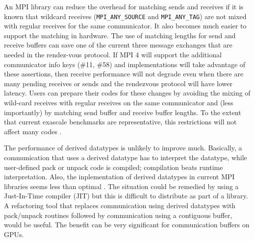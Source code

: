 An MPI library can reduce the overhead for matching sends and receives if it is 
known  that wildcard receives (\texttt{MPI\_ANY\_SOURCE} and 
\texttt{MPI\_ANY\_TAG}) are not mixed with regular receives for the same 
communicator. It also becomes much easier to support 
the matching in hardware. The use of matching lengths for send and receive 
buffers can save one of the current three message exchanges that are needed in 
the rendez-vous protocol. If MPI 4 will support the additional communicator 
info keys (\#11, \#58) and implementations will take advantage of these 
assertions, 
then receive performance will not degrade even when there are many pending 
receives or sends and the rendezvous protocol will have lower latency. Users 
can prepare their codes for these changes by avoiding 
the mixing of wild-card receives with regular receives on the same communicator 
and (less importantly) by matching send buffer and receive buffer lengths. To 
the extent that 
current exascale benchmarks are representative, this restrictions will not 
affect many codes \cite{klenk2017overview}.

The performance of derived datatypes is unlikely to improve much. Basically, 
a communication that uses a derived datatype has to interpret the datatype, 
while 
user-defined pack or unpack code is compiled; compilation beats runtime 
interpretation. Also, the inplementation of derived datatypes in current MPI 
libraries seems less than optimal \cite{datatype2012,carpen2017expected}. The situation 
could 
be remedied by 
using a Just-In-Time 
compiler (JIT) but this is difficult to distribute as part of a library. A 
refactoring tool that replaces communication using derived datatypes with 
pack/unpack routines followed by communication using a contiguous buffer, 
would be useful. The benefit can be very significant for communication buffers 
on GPUs.

